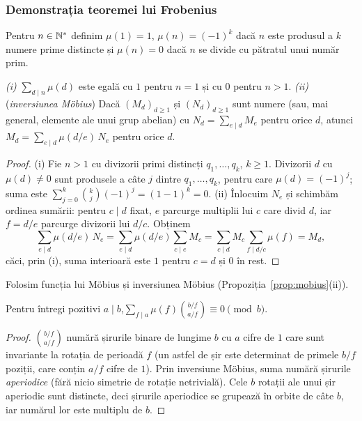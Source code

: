 \subsubsection*{Demonstrația teoremei lui Frobenius}\label{dem:frobenius}

\begin{definitie}\label{def:mobius}
Pentru $n\in\mathbb{N}^*$ definim $\mu(1)=1$, $\mu(n)=(-1)^k$ dacă $n$ este produsul a $k$ numere prime distincte și $\mu(n)=0$ dacă $n$ se divide cu pătratul unui număr prim.
\end{definitie}

\begin{propozitie}\label{prop:mobius}
\emph{(i)} $\displaystyle\sum_{d\mid n}\mu(d)$ este egală cu $1$ pentru $n=1$ și cu $0$ pentru $n>1$.
\emph{(ii)} (\emph{inversiunea Möbius}) Dacă $(M_d)_{d\ge1}$ și $(N_d)_{d\ge1}$ sunt numere (sau, mai general, elemente ale unui grup abelian) cu $N_d=\sum_{e\mid d}M_e$ pentru orice $d$, atunci $M_d=\sum_{e\mid d}\mu(d/e)\,N_e$ pentru orice $d$.
\end{propozitie}

\begin{proof}
(i) Fie $n>1$ cu divizorii primi distincți $q_1,\dots,q_k$, $k\ge1$. Divizorii $d$ cu $\mu(d)\neq0$ sunt produsele a câte $j$ dintre $q_1,\dots,q_k$, pentru care $\mu(d)=(-1)^j$; suma este $\sum_{j=0}^{k}\binom kj(-1)^j=(1-1)^k=0$.
(ii) Înlocuim $N_e$ și schimbăm ordinea sumării: pentru $c\mid d$ fixat, $e$ parcurge multiplii lui $c$ care divid $d$, iar $f=d/e$ parcurge divizorii lui $d/c$. Obținem
\[
\sum_{e\mid d}\mu(d/e)\,N_e=\sum_{e\mid d}\mu(d/e)\sum_{c\mid e}M_c=\sum_{c\mid d}M_c\sum_{f\mid d/c}\mu(f)=M_d,
\]
căci, prin (i), suma interioară este $1$ pentru $c=d$ și $0$ în rest.
\end{proof}

Folosim funcția lui Möbius și inversiunea Möbius (Propoziția~\ref{prop:mobius}(ii)).

\begin{lema}\label{lema:coliere}
Pentru întregi pozitivi $a\mid b$,\quad $\displaystyle\sum_{f\mid a}\mu(f)\binom{b/f}{a/f}\equiv0\pmod b$.
\end{lema}

\begin{proof}
$\binom{b/f}{a/f}$ numără șirurile binare de lungime $b$ cu $a$ cifre de $1$ care sunt invariante la rotația de perioadă $f$ (un astfel de șir este determinat de primele $b/f$ poziții, care conțin $a/f$ cifre de $1$). Prin inversiune Möbius, suma numără șirurile \emph{aperiodice} (fără nicio simetrie de rotație netrivială). Cele $b$ rotații ale unui șir aperiodic sunt distincte, deci șirurile aperiodice se grupează în orbite de câte $b$, iar numărul lor este multiplu de $b$.
\end{proof}

